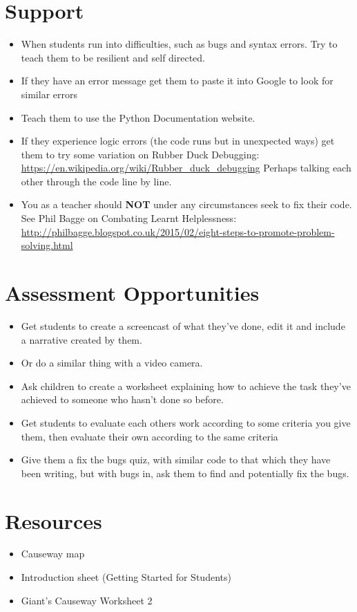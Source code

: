 \documentclass{geocraft-lesson-plan}
\begin{document}
\section*{Support}
\begin{itemize}
\item When students run into difficulties, such as bugs and syntax errors. Try to teach them to be resilient and self
  directed. 
\item If they have an error message get them to paste it into Google to look for similar errors
\item Teach them to use the Python Documentation website.
\item If they experience logic errors (the code runs but in unexpected ways) get them to try some variation on Rubber
  Duck Debugging: {\textcolor{greenish} {\url{https://en.wikipedia.org/wiki/Rubber_duck_debugging}}} Perhaps talking
  each other through the code line by line.
\item You as a teacher should \textbf{NOT} under any circumstances seek to fix their code. See Phil Bagge on Combating
  Learnt Helplessness: 
    {\textcolor{greenish} {\url{http://philbagge.blogspot.co.uk/2015/02/eight-steps-to-promote-problem-solving.html}}} 
\end{itemize}

\section*{Assessment Opportunities}
\begin{itemize}
\item Get students to create a screencast of what they've done, edit it and include a narrative created by them.
\item Or do a similar thing with a video camera.
\item Ask children to create a worksheet explaining how to achieve the task they've achieved to someone who hasn't done
  so before.
\item Get students to evaluate each others work according to some criteria you give them, then evaluate their own
  according to the same criteria
\item Give them a fix the bugs quiz, with similar code to that which they have been writing, but with bugs in, ask them
  to find and potentially fix the bugs.
\end{itemize}

\section*{Resources}
\begin{itemize}
\item Causeway map
\item Introduction sheet (Getting Started for Students)
\item Giant’s Causeway Worksheet 2
\end{itemize}
\end{document}
